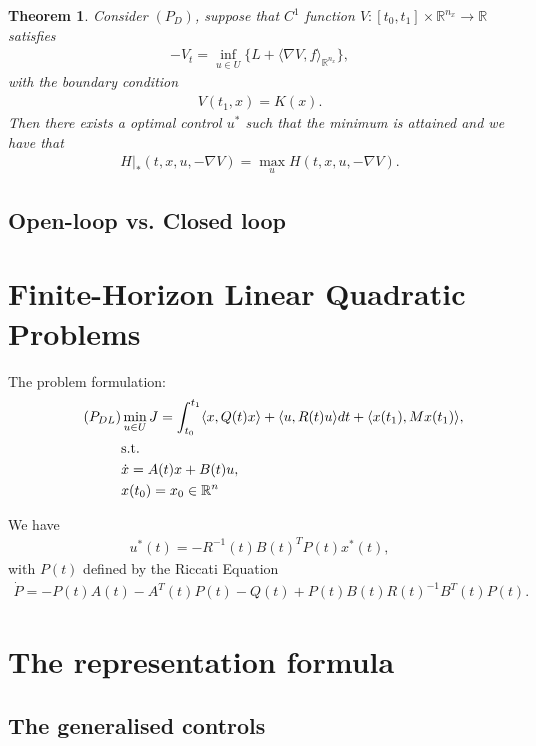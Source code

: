 \documentclass[a4paper,11pt,fleqn]{book}
\newtheorem{theorem}{Theorem}[section]
\theoremstyle{definition}
\theoremstyle{remark}
\begin{document}
\begin{theorem}
	Consider $(P_D)$, suppose that $C^1$ function $V: [t_0, t_1] \times \mathbb{R}^{n_x} \rightarrow \mathbb{R} $ satisfies
	\begin{align*}
		-V_t = \inf_{u \in U} \bigg\{L + \langle \nabla V, f \rangle_{\mathbb{R}^{n_x}} \bigg\},
	\end{align*}
	with the boundary condition
	\begin{align*}
		V(t_1, x) = K(x). 
	\end{align*}
	Then there exists a optimal control $u^*$ such that the minimum is attained and we have
	that
	\begin{align*}
		H|_*(t, x, u, - \nabla V) = \max_u H(t, x, u, -\nabla V ). 
	\end{align*}
\end{theorem} 

\subsection{Open-loop vs. Closed loop}


\section{Finite-Horizon Linear Quadratic Problems}
The problem formulation:
\begin{align*}
	\tag{$P_{DL}$}
	& \min_{u \in U} J = \int_{t_0}^{t_1} \langle x, Q(t)x\rangle  + \langle u, R(t)u \rangle dt + \langle x(t_1), M x(t_1) \rangle , \\
	&\text{s.t.}\\
	& \dot{x} = A(t) x + B(t)u, \\
	& x(t_0) = x_0 \in \mathbb{R}^n
\end{align*}


We have
\begin{align*}
	u^*(t) = - R^{-1}(t) B(t)^T P(t) x^*(t),
\end{align*}
with $P(t)$ defined by the Riccati Equation
\begin{align*}
	\dot{P} = -P(t) A(t) - A^T(t) P(t) - Q(t) + P(t)B(t)R(t)^{-1} B^T(t)P(t). 
\end{align*}


\section{The representation formula}
\subsection{The generalised controls}
\end{document}
